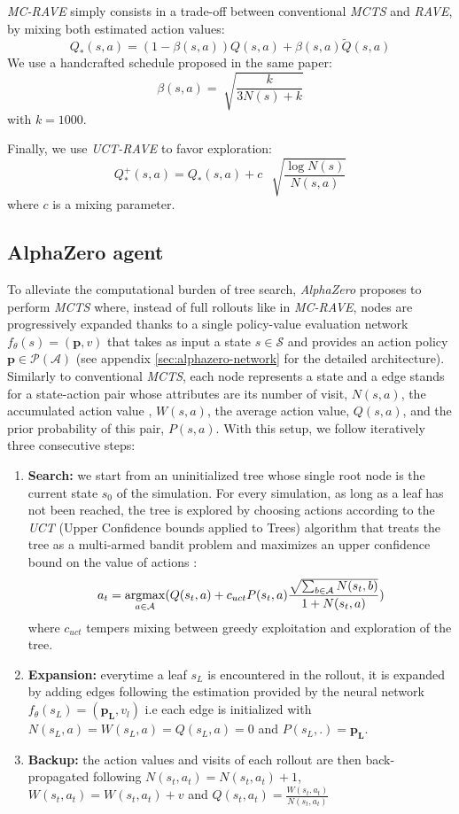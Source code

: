 \documentclass[journal, a4paper]{IEEEtran}
\newcommand{\argmax}{\operatornamewithlimits{argmax}}
\begin{document}
\textit{MC-RAVE} simply consists in a trade-off between conventional \textit{MCTS} and \textit{RAVE}, by mixing both estimated action values:
$$Q_*(s,a) = (1-\beta(s,a))Q(s,a) + \beta(s,a)\tilde Q(s,a)$$
We use a handcrafted schedule proposed in the same paper\cite{mc-rave}:
$$\beta(s,a) = \sqrt[]{\frac{k}{3N(s)+k}}$$
with $k=1000$.

Finally, we use \textit{UCT-RAVE} \cite{mc-rave} to favor exploration:
$$Q_*^+(s,a) = Q_*(s,a) + c\:\:\sqrt[]{\frac{\log N(s)}{N(s,a)}}$$
where $c$  is a mixing parameter.

\subsection{AlphaZero agent}
\label{ssec:alphazero}
    To alleviate the computational burden of tree search, \textit{AlphaZero}\cite{alphazero} proposes to perform \textit{MCTS} where, instead of full rollouts like in \textit{MC-RAVE}, nodes are progressively expanded thanks to a single policy-value evaluation network $f_\theta(s)=(\mathbf{p}, v)$ that takes as input a state $s\in \mathcal{S}$ and provides an action policy $\mathbf{p}\in\mathcal{P}(\mathcal{A})$ (see appendix \ref{sec:alphazero-network} for the detailed architecture). Similarly to conventional \textit{MCTS}, each node represents a state and a edge stands for a state-action pair whose attributes are its number of visit, $N(s,a)$, the accumulated action value , $W(s,a)$, the average action value, $Q(s,a)$, and the prior probability of this pair, $P(s,a)$. With this setup, we follow iteratively three consecutive steps:
    \begin{enumerate}
        \item \textbf{Search:} we start from an uninitialized tree whose single root node is the current state $s_0$ of the simulation. For every simulation, as long as a leaf has not been reached, the tree is explored by choosing actions according to the \textit{UCT} (Upper Confidence bounds applied to Trees) algorithm that treats the tree as a multi-armed bandit problem and maximizes an upper confidence bound on the value of actions : $$a_t=\argmax_{a\in\mathcal{A}}(Q(s_t, a)+c_{uct}P(s_t,a)\frac{\sqrt{\sum_{b\in\mathcal{A}}N(s_t, b)}}{1+N(s_t,a)})$$ where $c_{uct}$ tempers mixing between greedy exploitation and exploration of the tree.
        \item \textbf{Expansion:} everytime a leaf $s_L$ is encountered in the rollout, it is expanded by adding edges following the estimation provided by the neural network $f_\theta(s_L)=(\mathbf{p_L}, v_l)$ i.e each edge is initialized with $N(s_L, a)=W(s_L,a)=Q(s_L,a)=0$ and $P(s_L,.)=\mathbf{p_L}$.
        \item \textbf{Backup:} the action values and visits of each rollout are then back-propagated following $N(s_t, a_t) = N(s_t, a_t) + 1$, $W(s_t, a_t) = W(s_t, a_t) + v$ and $Q(s_t, a_t)=\frac{W(s_t, a_t)}{N(s_t, a_t)}$
    \end{enumerate}
\end{document}
